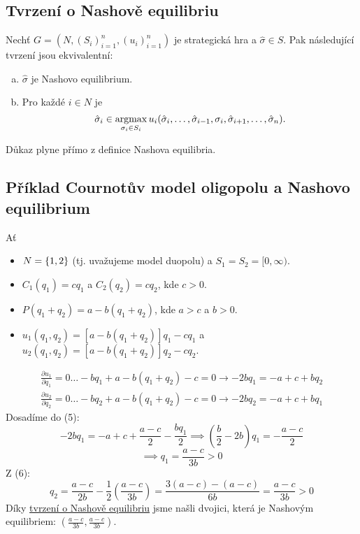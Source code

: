 \subsection{Tvrzení o Nashově equilibriu}\label{tvrNash}
Nechť $G = (N, (S_i)^n_{i=1}, (u_i)^n_{i=1})$ je strategická hra a $\hat \sigma \in S$. Pak následující tvrzení jsou 
ekvivalentní:
\begin{enumerate}[(a)]
    \item $\hat \sigma$ je Nashovo equilibrium.
    \item Pro každé $i \in N$ je
    \[
        \hat \sigma_i \in \operatorname*{argmax}_{\sigma_i \in S_i} u_i (\hat \sigma_i, \dots, \hat \sigma_{i-1}, \sigma_i, 
        \hat \sigma_{i+1}, \dots, \hat \sigma_n).
    \]
\end{enumerate}
Důkaz plyne přímo z definice Nashova equilibria.

\subsection{Příklad Cournotův model oligopolu a Nashovo equilibrium}
Ať
\begin{itemize}
    \item $N = \left\lbrace 1,2 \right\rbrace$ (tj. uvažujeme model duopolu) a $S_1 = S_2 = [0, \infty)$.
    \item $C_1(q_1) = cq_1$ a $C_2(q_2) = cq_2$, kde $c>0$.
    \item $P(q_1 + q_2) = a- b(q_1 + q_2)$, kde $a>c$ a $b>0$.
    \item $u_1(q_1, q_2) = [a-b(q_1 + q_2)]q_1 - cq_1$ a \\
    $u_2(q_1, q_2) = [a-b(q_1 + q_2)]q_2 - cq_2$.
\end{itemize}
\begin{align}
    \frac{\partial u_1}{\partial q_1} = 0 \dots -bq_1 + a-b(q_1 + q_2) -c = 0 \rightarrow -2bq_1 = -a + c + bq_2 \\
    \frac{\partial u_2}{\partial q_2} = 0 \dots -bq_2 + a-b(q_1 + q_2) -c = 0 \rightarrow -2bq_2 = -a + c + bq_1
\end{align}
Dosadíme do (5):
\[
    -2bq_1 = -a + c + \frac{a-c}{2} - \frac{bq_1}{2} \implies \left(\frac{b}{2} - 2b\right)q_1 = -\frac{a-c}{2}
\]
\[
    \implies q_1 = \frac{a-c}{3b} > 0
\]
Z (6):
\[
    q_2 = \frac{a-c}{2b} - \frac{1}{2}\left(\frac{a-c}{3b}\right) = \frac{3 (a-c) - (a-c)}{6b} = \frac{a-c}{3b} > 0
\]
Díky \hyperref[tvrNash]{tvrzení o Nashově equilibriu} jsme našli dvojici, která je Nashovým equilibriem: 
$\left(\frac{a-c}{3b}, \frac{a-c}{3b}\right)$.
\newpage
